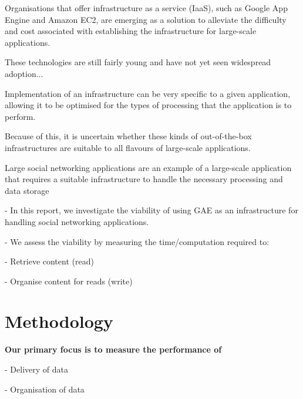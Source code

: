 \documentclass{article}
\begin{document}
Organisations that offer infrastructure as a service (IaaS), such as Google App Engine and Amazon EC2, are emerging as a solution to alleviate the difficulty and cost associated with establishing the infrastructure for large-scale applications.



\crumbs
{
	These technologies are still fairly young and have not yet seen widespread adoption...
	
	Implementation of an infrastructure can be very specific to a given application, allowing it to be optimised for the types of processing that the application is to perform.
	
	Because of this, it is uncertain whether these kinds of out-of-the-box infrastructures are suitable to all flavours of large-scale applications.
}

\crumbs
{
	Large social networking applications are an example of a large-scale application that requires a suitable infrastructure to handle the necessary processing and data storage
}

\crumbs
{
	- In this report, we investigate the viability of using GAE as an infrastructure for handling social networking applications.
	
	- We assess the viability by measuring the time/computation required to:
	
	- Retrieve content (read)
	
	- Organise content for reads (write)
}


\section{Methodology} %
\label{sec:methodology}

\crumbs
{
\textbf{Our primary focus is to measure the performance of}

- Delivery of data

- Organisation of data

}
\end{document}
